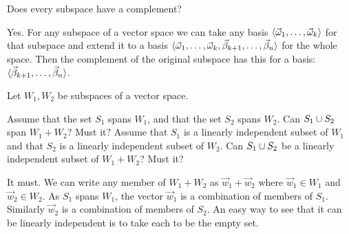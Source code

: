 \begin{exercises}
  \recommended \item 
    Does every subspace have a complement?
    \begin{answer}
      Yes.
      For any subspace of a vector space we can take any
      basis \( \langle\vec{\omega}_1,\dots,\vec{\omega}_k\rangle \) for that
      subspace and extend it to a basis
      \( \langle\vec{\omega}_1,\dots,\vec{\omega}_k,
                     \vec{\beta}_{k+1},\dots,\vec{\beta}_n\rangle \) for the whole
      space.
      Then the complement of the original subspace has this for a basis:
      \( \langle\vec{\beta}_{k+1},\dots,\vec{\beta}_n\rangle \).  
     \end{answer}
  \recommended \item 
    Let \( W_1, W_2 \) be subspaces of a vector space.
    \begin{exparts}
      \partsitem Assume that 
        the set \( S_1 \) spans \( W_1 \), and that the set \( S_2 \) spans 
        \( W_2 \).
        Can \( S_1\cup S_2 \) span \( W_1+W_2 \)?
        Must it?
      \partsitem Assume that \( S_1 \) is a linearly independent 
        subset of \( W_1 \)
        and that \( S_2 \) is a linearly independent subset of \( W_2 \).
        Can \( S_1\cup S_2 \) be a linearly independent subset of
        \( W_1+W_2 \)?
        Must it?
    \end{exparts}
    \begin{answer}
      \begin{exparts}
        \partsitem It must.
          We can write any member of \( W_1+W_2 \) as \( \vec{w}_1+\vec{w}_2 \)
          where \( \vec{w}_1\in W_1 \) and \( \vec{w}_2\in W_2 \).
          As \( S_1 \) spans \( W_1 \), the vector \( \vec{w}_1 \) is a
          combination of members of \( S_1 \).
          Similarly \( \vec{w}_2 \) is a combination of members of \( S_2 \).
        \partsitem An easy way to see that it can be linearly independent 
          is to take each to be the empty set.

\end{exparts}
\end{answer}
\end{exercises}
